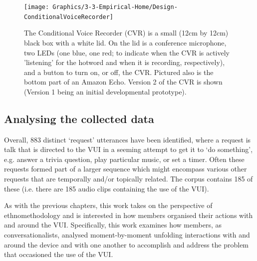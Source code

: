 \begin{figure}
    \centering
    \texttt{[image: Graphics/3-3-Empirical-Home/Design-ConditionalVoiceRecorder]}
    \caption[External design of the Conditional Voice Recorder (CVR).]{The Conditional Voice Recorder (CVR) is a small (12cm by 12cm) black box with a white lid. On the lid is a conference microphone, two LEDs (one blue, one red; to indicate when the \ac{CVR} is actively 'listening' for the hotword and when it is recording, respectively), and a button to turn on, or off, the CVR. Pictured also is the bottom part of an Amazon Echo. Version 2 of the \ac{CVR} is shown (Version 1 being an initial developmental prototype).}\label{fig:empirical home desig cvr}
\end{figure}






\subsection{Analysing the collected data}\label{sec:empirical home design analysis}
Overall, 883 distinct `request' utterances have been identified, where a request is talk that is directed to the \ac{VUI} in a seeming attempt to get it to `do something', e.g. answer a trivia question, play particular music, or set a timer.
Often these requests formed part of a larger sequence which might encompass various other requests that are temporally and/or topically related.
The corpus contains 185 of these (i.e. there are 185 audio clips containing the use of the \ac{VUI}).

\begin{revisedsubmission}
As with the previous chapters, this work takes on the perspective of ethnomethodology and is interested in how members organised their actions with and around the \ac{VUI}.
Specifically, this work examines how members, as conversationalists, analysed moment-by-moment unfolding interactions with and around the device and with one another to accomplish and address the problem that occasioned the use of the \ac{VUI}.
\end{revisedsubmission}

